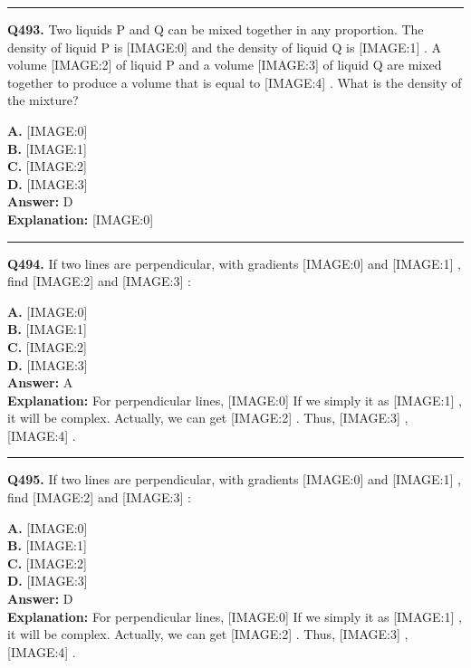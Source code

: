 \documentclass[12pt]{article}
\begin{document}
\hrule
\vspace{1em}


\noindent
\textbf{Q493.} Two liquids P and Q can be mixed together in any proportion. The density of liquid P is
[IMAGE:0]
and the density of liquid Q is
[IMAGE:1]
. A volume
[IMAGE:2]
of liquid P and a volume
[IMAGE:3]
of liquid Q are mixed together to produce a volume that is equal to
[IMAGE:4]
. What is the density of the mixture?



\textbf{A.} [IMAGE:0] \\
\textbf{B.} [IMAGE:1] \\
\textbf{C.} [IMAGE:2] \\
\textbf{D.} [IMAGE:3] \\

\textbf{Answer:} D \\
\textbf{Explanation:} [IMAGE:0]

\hrule
\vspace{1em}


\noindent
\textbf{Q494.} If two lines are perpendicular, with gradients
[IMAGE:0]
and
[IMAGE:1]
, find
[IMAGE:2]
and
[IMAGE:3]
:



\textbf{A.} [IMAGE:0] \\
\textbf{B.} [IMAGE:1] \\
\textbf{C.} [IMAGE:2] \\
\textbf{D.} [IMAGE:3] \\

\textbf{Answer:} A \\
\textbf{Explanation:} For perpendicular lines,
[IMAGE:0]
If we simply it as
[IMAGE:1]
, it will be complex.
Actually, we can get
[IMAGE:2]
.
Thus,
[IMAGE:3]
,
[IMAGE:4]
.

\hrule
\vspace{1em}


\noindent
\textbf{Q495.} If two lines are perpendicular, with gradients
[IMAGE:0]
and
[IMAGE:1]
, find
[IMAGE:2]
and
[IMAGE:3]
:



\textbf{A.} [IMAGE:0] \\
\textbf{B.} [IMAGE:1] \\
\textbf{C.} [IMAGE:2] \\
\textbf{D.} [IMAGE:3] \\

\textbf{Answer:} D \\
\textbf{Explanation:} For perpendicular lines,
[IMAGE:0]
If we simply it as
[IMAGE:1]
, it will be complex.
Actually, we can get
[IMAGE:2]
.
Thus,
[IMAGE:3]
,
[IMAGE:4]
.
\end{document}
